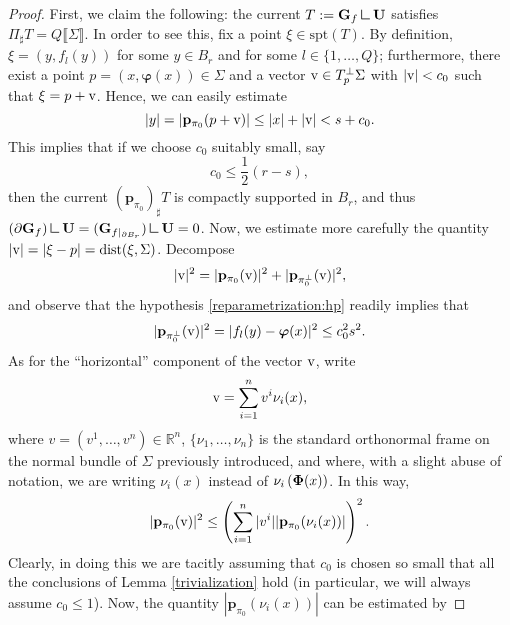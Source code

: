 \documentclass[a4paper,11pt,reqno]{amsart}
\theoremstyle{definition}
\numberwithin{equation}{section}
\numberwithin{subsection}{section}
\newcommand{\R}{\mathbb{R}}
\newcommand{\mres}{\mathbin{\vrule height 1.6ex depth 0pt width
0.13ex\vrule height 0.13ex depth 0pt width 1.3ex}}
\newcommand{\spt}{\mathrm{spt}}
\newcommand{\dist}{\mathrm{dist}}
\newcommand{\bphi}{\boldsymbol{\varphi}}
\newcommand{\p}{\mathbf{p}}
\begin{document}
\begin{proof}
First, we claim the following: the current $T := {\bf G}_{f} \mres {\bf U}$ satisfies $\Pi_{\sharp}T = Q \llbracket \Sigma \rrbracket$. In order to see this, fix a point $\xi \in \spt(T)$. By definition, $\xi = \left( y, f_{l}(y) \right)$ for some $y \in B_{r}$ and for some $l \in \{1,\dots,Q\}$; furthermore, there exist a point $p = (x, \bphi(x)) \in \Sigma$ and a vector ${\rm v} \in T_{p}^{\perp}\Sigma$ with $|{\rm v}| < c_{0}$ such that $\xi = p + {\rm v}$. Hence, we can easily estimate
\[
|y| = |\p_{\pi_{0}}(p + {\rm v})| \leq |x| + |{\rm v}| < s + c_{0}.
\]
This implies that if we choose $c_{0}$ suitably small, say
\begin{equation} \label{condition:1}
c_{0} \leq \frac{1}{2}(r - s),
\end{equation}
then the current $\left( \p_{\pi_{0}} \right)_{\sharp} T$ is compactly supported in $B_{r}$, and thus $(\partial {\bf G}_{f}) \mres {\bf U} = ({\bf G}_{f|_{\partial B_{r}}}) \mres {\bf U} = 0$. Now, we estimate more carefully the quantity $|{\rm v}| = |\xi - p| = \dist(\xi, \Sigma)$. Decompose 
\begin{equation} \label{wp:1}
|{\rm v}|^{2} = |\p_{\pi_{0}}({\rm v})|^{2} + |\p_{\pi_{0}^{\perp}}({\rm v})|^{2},
\end{equation}
and observe that the hypothesis \eqref{reparametrization:hp} readily implies that
\begin{equation} \label{wp:2}
|\p_{\pi_{0}^{\perp}}({\rm v})|^{2} = |f_{l}(y) - \bphi(x)|^{2} \leq c_{0}^{2} s^{2}.
\end{equation}
As for the ``horizontal'' component of the vector ${\rm v}$, write
\begin{equation} \label{wp:3}
{\rm v} = \sum_{i=1}^{n} v^{i} \nu_{i}(x),
\end{equation}
where $v = \left( v^{1}, \dots, v^{n} \right) \in \R^{n}$, $\lbrace \nu_{1}, \dots, \nu_{n} \rbrace$ is the standard orthonormal frame on the normal bundle of $\Sigma$ previously introduced, and where, with a slight abuse of notation, we are writing $\nu_{i}(x)$ instead of $\nu_{i}\left( {\bf \Phi}(x) \right)$. In this way,
\begin{equation} \label{wp:4}
|\p_{\pi_{0}}({\rm v})|^{2} \leq \left( \sum_{i=1}^{n} |v^{i}| |\p_{\pi_{0}}(\nu_{i}(x))| \right)^{2}.
\end{equation}
Clearly, in doing this we are tacitly assuming that $c_{0}$ is chosen so small that all the conclusions of Lemma \ref{trivialization} hold (in particular, we will always assume $c_{0} \leq 1$). Now, the quantity $|\p_{\pi_{0}}(\nu_{i}(x))|$ can be estimated by 

\end{proof}
\end{document}
